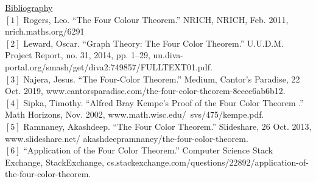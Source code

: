 \documentclass[11pt]{article}
\begin{document}
\noindent \underline{Bibliography}\\
$[1]$ Rogers, Leo. “The Four Colour Theorem.” NRICH, NRICH, Feb. 2011, nrich.maths.org/6291\\
\noindent 
$[2]$ Leward, Oscar. “Graph Theory: The Four Color Theorem.” U.U.D.M. Project Report, no. 31, 2014, pp. 1–29, uu.diva-portal.org/smash/get/diva2:749857/FULLTEXT01.pdf. \\
\noindent 
$[3]$ Najera, Jesus. “The Four-Color Theorem.” Medium, Cantor's Paradise, 22 Oct. 2019, www.cantorsparadise.com/the-four-color-theorem-8eece6ab6b12.\\
\noindent 
$[4]$ Sipka, Timothy. “Alfred Bray Kempe's Proof of the Four Color Theorem .” Math Horizons, Nov. 2002, www.math.wisc.edu/~svs/475/kempe.pdf. \\
\noindent 
$[5]$ Ramnaney, Akashdeep. “The Four Color Theorem.” Slideshare, 26 Oct. 2013, www.slideshare.net/ akashdeepramnaney/the-four-color-theorem.\\

$[6]$ “Application of the Four Color Theorem.” Computer Science Stack Exchange, StackExchange, cs.stackexchange.com/questions/22892/application-of-the-four-color-theorem.\\






  
  
\end{document}
